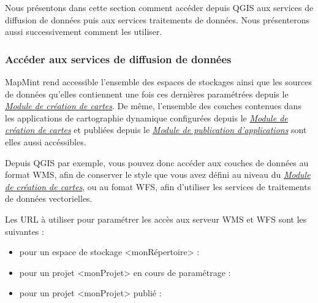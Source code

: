 \documentclass[letterpaper,10pt,french]{sphinxmanual}
\begin{document}
Nous présentons dans cette section comment accéder depuis QGIS aux
services de diffusion de données puis aux services traitements de
données. Nous présenterons aussi successivement comment les utiliser.


\subsubsection{Accéder aux services de diffusion de données}
\label{introduction/usemapmint:acceder-aux-services-de-diffusion-de-donnees}
MapMint rend accessible l'ensemble des espaces de stockages ainsi que
les sources de données qu'elles contiennent une fois ces dernières
paramétrées depuis le {\hyperref[maps/index:maps]{\emph{Module de création de cartes}}}. De même, l'ensemble des
couches contenues dans les applications de cartographie dynamique
configurées depuis le {\hyperref[maps/index:maps]{\emph{Module de création de cartes}}} et publiées depuis le {\hyperref[apps/index:apps]{\emph{Module de publication d'applications}}}
sont elles aussi accéssibles.

Depuis QGIS par exemple, vous pouvez donc accéder aux couches de
données au format WMS, afin de conserver le style que vous avez défini
au niveau du {\hyperref[maps/index:maps]{\emph{Module de création de cartes}}}, ou au fomat WFS, afin d'utiliser les
services de traitements de données vectorielles.

Les URL à utiliser pour paramétrer les accès aux serveur WMS et WFS
sont les suivantes :
\begin{itemize}
\item {} 
pour un espace de stockage \textless{}monRépertoire\textgreater{} :


\item {} 
pour un projet \textless{}monProjet\textgreater{} en cours de paramétrage :


\item {} 
pour un projet \textless{}monProjet\textgreater{} publié :


\end{itemize}
\end{document}
